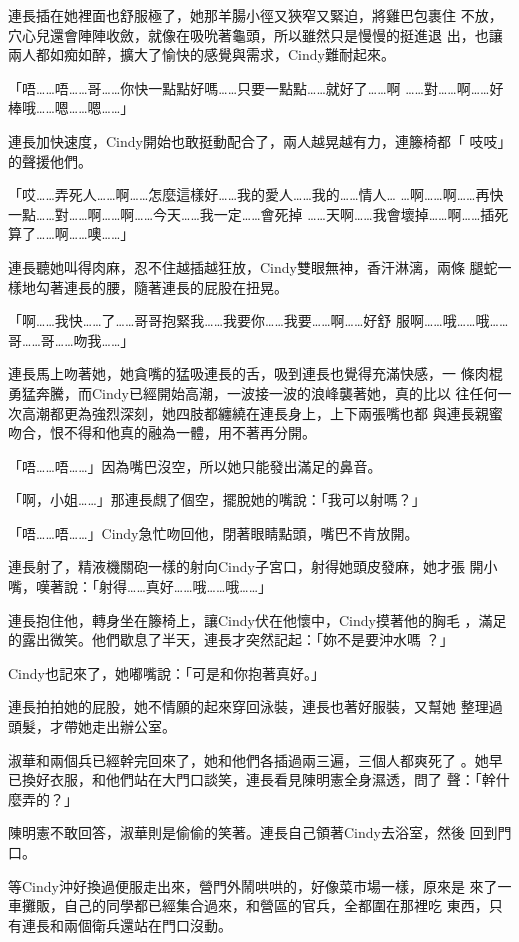 連長插在她裡面也舒服極了，她那羊腸小徑又狹窄又緊迫，將雞巴包裹住
不放，穴心兒還會陣陣收斂，就像在吸吮著龜頭，所以雖然只是慢慢的挺進退
出，也讓兩人都如痴如醉，擴大了愉快的感覺與需求，Cindy難耐起來。

「唔……唔……哥……你快一點點好嗎……只要一點點……就好了……啊
……對……啊……好棒哦……嗯……嗯……」

連長加快速度，Cindy開始也敢挺動配合了，兩人越晃越有力，連籐椅都「
吱吱」的聲援他們。

「哎……弄死人……啊……怎麼這樣好……我的愛人……我的……情人…
…啊……啊……再快一點……對……啊……啊……今天……我一定……會死掉
……天啊……我會壞掉……啊……插死算了……啊……噢……」

連長聽她叫得肉麻，忍不住越插越狂放，Cindy雙眼無神，香汗淋漓，兩條
腿蛇一樣地勾著連長的腰，隨著連長的屁股在扭晃。

「啊……我快……了……哥哥抱緊我……我要你……我要……啊……好舒
服啊……哦……哦……哥……哥……吻我……」

連長馬上吻著她，她貪嘴的猛吸連長的舌，吸到連長也覺得充滿快感，一
條肉棍勇猛奔騰，而Cindy已經開始高潮，一波接一波的浪峰襲著她，真的比以
往任何一次高潮都更為強烈深刻，她四肢都纏繞在連長身上，上下兩張嘴也都
與連長親蜜吻合，恨不得和他真的融為一體，用不著再分開。

「唔……唔……」因為嘴巴沒空，所以她只能發出滿足的鼻音。

「啊，小姐……」那連長覤了個空，擺脫她的嘴說：「我可以射嗎？」

「唔……唔……」Cindy急忙吻回他，閉著眼睛點頭，嘴巴不肯放開。

連長射了，精液機關砲一樣的射向Cindy子宮口，射得她頭皮發麻，她才張
開小嘴，嘆著說：「射得……真好……哦……哦……」

連長抱住他，轉身坐在籐椅上，讓Cindy伏在他懷中，Cindy摸著他的胸毛
，滿足的露出微笑。他們歇息了半天，連長才突然記起：「妳不是要沖水嗎
？」

Cindy也記來了，她嘟嘴說：「可是和你抱著真好。」

連長拍拍她的屁股，她不情願的起來穿回泳裝，連長也著好服裝，又幫她
整理過頭髮，才帶她走出辦公室。

淑華和兩個兵已經幹完回來了，她和他們各插過兩三遍，三個人都爽死了
。她早已換好衣服，和他們站在大門口談笑，連長看見陳明憲全身濕透，問了
聲：「幹什麼弄的？」

陳明憲不敢回答，淑華則是偷偷的笑著。連長自己領著Cindy去浴室，然後
回到門口。

等Cindy沖好換過便服走出來，營門外鬧哄哄的，好像菜市場一樣，原來是
來了一車攤販，自己的同學都已經集合過來，和營區的官兵，全都圍在那裡吃
東西，只有連長和兩個衛兵還站在門口沒動。

